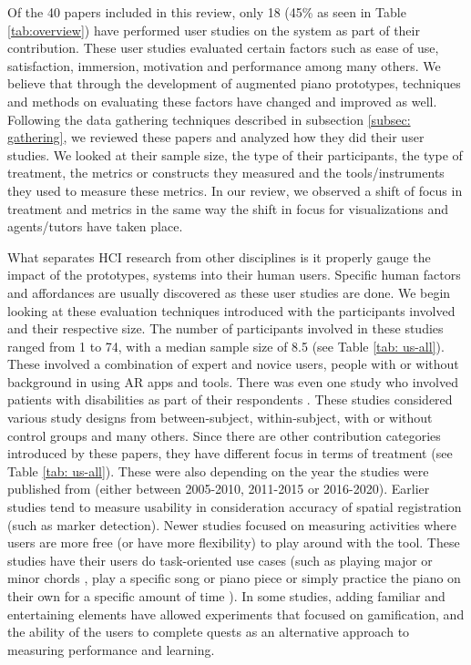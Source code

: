 \documentclass[sigchi, review]{acmart}
\begin{document}
Of the 40 papers included in this review, only 18 (45\% as seen in Table \ref{tab:overview}) have performed user studies on the system  as part of their contribution. These user studies evaluated certain factors such as ease of use, satisfaction, immersion, motivation and performance among many others. We believe that through the development of augmented piano prototypes, techniques and methods on evaluating these factors have changed and improved as well. Following the data gathering techniques described in subsection \ref{subsec: gathering}, we reviewed these papers and analyzed how they did their user studies. We looked at their sample size, the type of their participants, the type of treatment, the metrics or constructs they measured and the tools/instruments they used to measure these metrics. In our review, we observed a shift of focus in treatment and metrics in the same way the shift in focus for visualizations and agents/tutors have taken place. 

What separates HCI research from other disciplines is it properly gauge the impact of the prototypes, systems into their human users. Specific human factors and affordances are usually discovered as these user studies are done. We begin looking at these evaluation techniques introduced with the participants involved and their respective size. The number of participants involved in these studies ranged from 1 to 74, with a median sample size of 8.5 (see Table \ref{tab: us-all}). These involved a combination of expert and novice users, people with or without background in using AR apps and tools. There was even one study who involved patients with disabilities as part of their respondents \cite{correa2009computer}. These studies considered various study designs from between-subject, within-subject, with or without control groups and many others. Since there are other contribution categories introduced by these papers, they have different focus in terms of treatment (see Table \ref{tab: us-all}). These were also depending on the year the studies were published from (either between 2005-2010, 2011-2015 or 2016-2020). Earlier studies tend to measure usability in consideration accuracy of spatial registration (such as marker detection). Newer studies focused on measuring activities where users are more free (or have more flexibility) to play around with the tool. These studies have their users do task-oriented use cases (such as playing major or minor chords \cite{nugraha2014pemanfaatan, xiao2010mirrorfugue}, play a specific song or piano piece \cite{chow2013music, sandnes2019enhanced,pan2018pilot} or simply practice the piano on their own for a specific amount of time \cite{weing2013piano, raymaekers2014game}). In some studies, adding familiar and entertaining elements have allowed experiments that focused on gamification, and the ability of the users to complete quests as an alternative approach to measuring performance and learning. 
\end{document}
